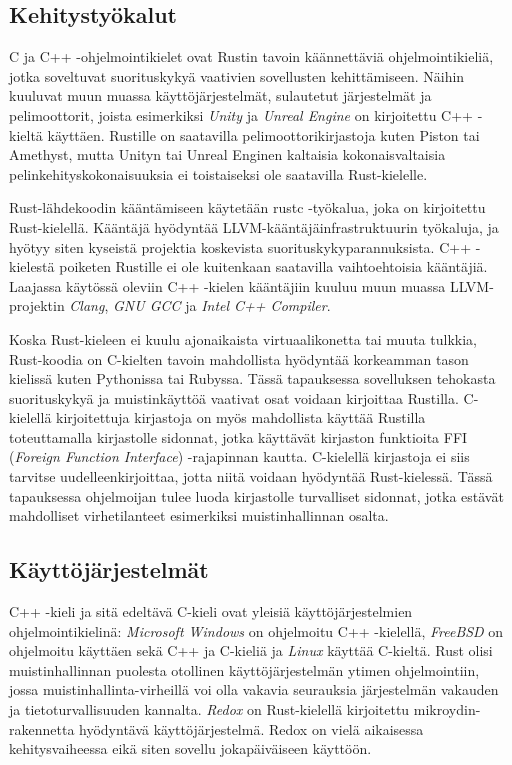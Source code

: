 \documentclass[finnish]{tktltiki2}
\theoremstyle{definition}
\theoremstyle{remark}
\begin{document}
\subsection{Kehitystyökalut}

C ja C++ -ohjelmointikielet ovat Rustin tavoin käännettäviä ohjelmointikieliä, jotka soveltuvat suorituskykyä vaativien sovellusten kehittämiseen. Näihin kuuluvat muun muassa käyttöjärjestelmät, sulautetut järjestelmät ja pelimoottorit, joista esimerkiksi \textit{Unity} ja \textit{Unreal Engine} on kirjoitettu C++ -kieltä käyttäen. Rustille on saatavilla pelimoottorikirjastoja kuten Piston tai Amethyst, mutta Unityn tai Unreal Enginen kaltaisia kokonaisvaltaisia pelinkehityskokonaisuuksia ei toistaiseksi ole saatavilla Rust-kielelle.\cite{AreWeGameYetEngines}

Rust-lähdekoodin kääntämiseen käytetään rustc -työkalua, joka on kirjoitettu Rust-kielellä. Kääntäjä hyödyntää LLVM-kääntäjäinfrastruktuurin työkaluja, ja hyötyy siten kyseistä projektia koskevista suorituskykyparannuksista. \cite{HowFastIsRust} C++ -kielestä poiketen Rustille ei ole kuitenkaan saatavilla vaihtoehtoisia kääntäjiä. Laajassa käytössä oleviin C++ -kielen kääntäjiin kuuluu muun muassa LLVM-projektin \textit{Clang}, \textit{GNU GCC} ja \textit{Intel C++ Compiler}.

Koska Rust-kieleen ei kuulu ajonaikaista virtuaalikonetta tai muuta tulkkia, Rust-koodia on C-kielten tavoin mahdollista hyödyntää korkeamman tason kielissä kuten Pythonissa tai Rubyssa. Tässä tapauksessa sovelluksen tehokasta suorituskykyä ja muistinkäyttöä vaativat osat voidaan kirjoittaa Rustilla.\cite{RustInsideOtherLanguages} C-kielellä kirjoitettuja kirjastoja on myös mahdollista käyttää Rustilla toteuttamalla kirjastolle sidonnat, jotka käyttävät kirjaston funktioita FFI (\textit{Foreign Function Interface}) -rajapinnan kautta. C-kielellä kirjastoja ei siis tarvitse uudelleenkirjoittaa, jotta niitä voidaan hyödyntää Rust-kielessä. Tässä tapauksessa ohjelmoijan tulee luoda kirjastolle turvalliset sidonnat, jotka estävät mahdolliset virhetilanteet esimerkiksi muistinhallinnan osalta.

\subsection{Käyttöjärjestelmät}

C++ -kieli ja sitä edeltävä C-kieli ovat yleisiä käyttöjärjestelmien ohjelmointikielinä: \textit{Microsoft Windows} on ohjelmoitu C++ -kielellä, \textit{FreeBSD} on ohjelmoitu käyttäen sekä C++ ja C-kieliä ja \textit{Linux} käyttää C-kieltä. Rust olisi muistinhallinnan puolesta otollinen käyttöjärjestelmän ytimen ohjelmointiin, jossa muistinhallinta-virheillä voi olla vakavia seurauksia järjestelmän vakauden ja tietoturvallisuuden kannalta. \textit{Redox} on Rust-kielellä kirjoitettu mikroydin-rakennetta hyödyntävä käyttöjärjestelmä.\cite{WhatRedoxIs} Redox on vielä aikaisessa kehitysvaiheessa eikä siten sovellu jokapäiväiseen käyttöön.
\end{document}
